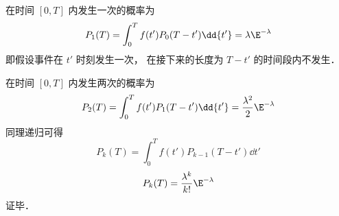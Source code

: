 在时间 $[0,T]$ 内发生一次的概率为
\begin{equation}
P_1(T) = \int_{0}^{T} f(t') P_0(T-t')\dd{t'} = \lambda \E^{-\lambda}
\end{equation}
即假设事件在 $t'$ 时刻发生一次， 在接下来的长度为 $T-t'$ 的时间段内不发生．

在时间 $[0,T]$ 内发生两次的概率为
\begin{equation}
P_2(T) = \int_{0}^{T} f(t') P_1(T-t')\dd{t'} = \frac{\lambda^2}{2}\E^{-\lambda}
\end{equation}
同理递归可得
\begin{equation}
P_{k}(T) = \int_{0}^{T} f(t') P_{k-1}(T-t')\dd{t'}
\end{equation}
\begin{equation}
P_k(T) = \frac{\lambda^k}{k!}\E^{-\lambda}
\end{equation}
证毕．
